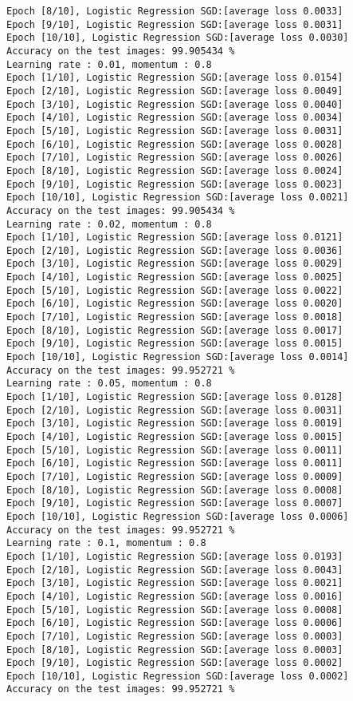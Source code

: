 \documentclass[10pt]{article}
\newcommand{\0}{{\mathbf{0}}}
\newcommand{\1}{{\mathbf{1}}}
\begin{document}
\begin{verbatim}
Epoch [8/10], Logistic Regression SGD:[average loss 0.0033]
Epoch [9/10], Logistic Regression SGD:[average loss 0.0031]
Epoch [10/10], Logistic Regression SGD:[average loss 0.0030]
Accuracy on the test images: 99.905434 %
Learning rate : 0.01, momentum : 0.8
Epoch [1/10], Logistic Regression SGD:[average loss 0.0154]
Epoch [2/10], Logistic Regression SGD:[average loss 0.0049]
Epoch [3/10], Logistic Regression SGD:[average loss 0.0040]
Epoch [4/10], Logistic Regression SGD:[average loss 0.0034]
Epoch [5/10], Logistic Regression SGD:[average loss 0.0031]
Epoch [6/10], Logistic Regression SGD:[average loss 0.0028]
Epoch [7/10], Logistic Regression SGD:[average loss 0.0026]
Epoch [8/10], Logistic Regression SGD:[average loss 0.0024]
Epoch [9/10], Logistic Regression SGD:[average loss 0.0023]
Epoch [10/10], Logistic Regression SGD:[average loss 0.0021]
Accuracy on the test images: 99.905434 %
Learning rate : 0.02, momentum : 0.8
Epoch [1/10], Logistic Regression SGD:[average loss 0.0121]
Epoch [2/10], Logistic Regression SGD:[average loss 0.0036]
Epoch [3/10], Logistic Regression SGD:[average loss 0.0029]
Epoch [4/10], Logistic Regression SGD:[average loss 0.0025]
Epoch [5/10], Logistic Regression SGD:[average loss 0.0022]
Epoch [6/10], Logistic Regression SGD:[average loss 0.0020]
Epoch [7/10], Logistic Regression SGD:[average loss 0.0018]
Epoch [8/10], Logistic Regression SGD:[average loss 0.0017]
Epoch [9/10], Logistic Regression SGD:[average loss 0.0015]
Epoch [10/10], Logistic Regression SGD:[average loss 0.0014]
Accuracy on the test images: 99.952721 %
Learning rate : 0.05, momentum : 0.8
Epoch [1/10], Logistic Regression SGD:[average loss 0.0128]
Epoch [2/10], Logistic Regression SGD:[average loss 0.0031]
Epoch [3/10], Logistic Regression SGD:[average loss 0.0019]
Epoch [4/10], Logistic Regression SGD:[average loss 0.0015]
Epoch [5/10], Logistic Regression SGD:[average loss 0.0011]
Epoch [6/10], Logistic Regression SGD:[average loss 0.0011]
Epoch [7/10], Logistic Regression SGD:[average loss 0.0009]
Epoch [8/10], Logistic Regression SGD:[average loss 0.0008]
Epoch [9/10], Logistic Regression SGD:[average loss 0.0007]
Epoch [10/10], Logistic Regression SGD:[average loss 0.0006]
Accuracy on the test images: 99.952721 %
Learning rate : 0.1, momentum : 0.8
Epoch [1/10], Logistic Regression SGD:[average loss 0.0193]
Epoch [2/10], Logistic Regression SGD:[average loss 0.0043]
Epoch [3/10], Logistic Regression SGD:[average loss 0.0021]
Epoch [4/10], Logistic Regression SGD:[average loss 0.0016]
Epoch [5/10], Logistic Regression SGD:[average loss 0.0008]
Epoch [6/10], Logistic Regression SGD:[average loss 0.0006]
Epoch [7/10], Logistic Regression SGD:[average loss 0.0003]
Epoch [8/10], Logistic Regression SGD:[average loss 0.0003]
Epoch [9/10], Logistic Regression SGD:[average loss 0.0002]
Epoch [10/10], Logistic Regression SGD:[average loss 0.0002]
Accuracy on the test images: 99.952721 %
\end{verbatim}
\end{document}
